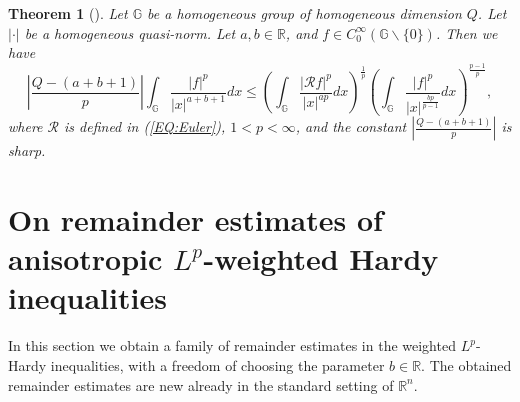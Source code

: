 \documentclass[a4paper,12pt,reqno]{amsart}
\renewcommand\eqref[1]{(\ref{#1})} %
\numberwithin{equation}{section}
\theoremstyle{plain}
\newtheorem{thm}{Theorem}[section]
\theoremstyle{definition}
\begin{document}
\begin{thm}[\cite{ORS16}]
\label{CKN}
Let $\mathbb{G}$ be a homogeneous group
of homogeneous dimension $Q$. Let $|\cdot|$ be a homogeneous quasi-norm. Let $a,b\in\mathbb{R}$, and $f\in C_{0}^{\infty}(\mathbb{G}\backslash\{0\})$. Then we have
\begin{equation}\label{CKN1}
\left|\frac{Q-(a+b+1)}{p}\right|\int_{\mathbb{G}}\frac{|f|^{p}}{|x|^{a+b+1}}dx\leq\left(\int_{\mathbb{G}}
\frac{|\mathcal{R}f|^{p}}{|x|^{ap}}dx\right)^{\frac{1}{p}}\left(\int_{\mathbb{G}}
\frac{|f|^{p}}{|x|^{\frac{bp}{p-1}}}dx\right)^{\frac{p-1}{p}},
\end{equation}
where $\mathcal{R}$ is defined in \eqref{EQ:Euler}, $1<p<\infty$, and the constant $\left|\frac{Q-(a+b+1)}{p}\right|$ is sharp.
\end{thm}




\section{On remainder estimates of anisotropic $L^{p}$-weighted Hardy inequalities}
\label{SEC:rem_estimates}

In this section we obtain a family of remainder estimates in the weighted $L^p$-Hardy inequalities, with a freedom of choosing the parameter $b\in\mathbb R$. The obtained remainder estimates are new already in the standard setting of $\mathbb R^n$.
\end{document}
